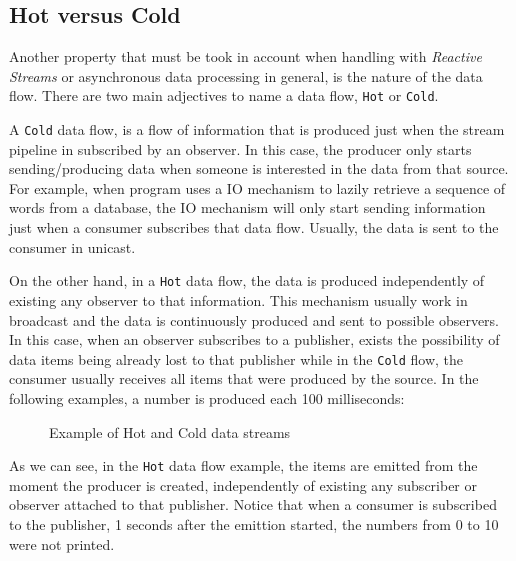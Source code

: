 	\subsection{Hot versus Cold}
	
	Another property that must be took in account when handling with \textit{Reactive Streams} or asynchronous data processing in general, is the nature of the data flow. 
	There are two main adjectives to name a data flow, \texttt{Hot} or \texttt{Cold}. 

	A \texttt{Cold} data flow, is a flow of information that is produced just when the stream pipeline in subscribed by an observer. In this case, the producer only starts sending/producing data when someone is interested in the data from that source. 
	For example, when program uses a IO mechanism to lazily retrieve a sequence of words from a database, the IO mechanism will only start sending information just when a consumer subscribes that data flow. Usually, the data is sent to the consumer in unicast.
	
	On the other hand, in a \texttt{Hot} data flow, the data is produced independently of existing any observer to that information. This mechanism usually work in broadcast and the data is continuously produced and sent to possible observers.
	In this case, when an observer subscribes to a publisher, exists the possibility of data items being already lost to that publisher while in the \texttt{Cold} flow, the consumer usually receives all items that were produced by the source.
	In the following examples, a number is produced each 100 milliseconds:

	\begin{figure}[H]
		\centering
		\begin{subfigure}{.5\textwidth}
			\centering
		 \end{subfigure}	
	\qquad\qquad
		 \begin{subfigure}{.5\textwidth}
			\centering
		\end{subfigure}		
	  \caption{Example of Hot and Cold data streams}
	  \label{fig:exmplo3}
	\end{figure}

	
	As we can see, in the \texttt{Hot} data flow example, the items are emitted from the moment the producer is created, independently of existing any subscriber or observer attached to that publisher. Notice that when a consumer is subscribed to the publisher, 1 seconds after the emittion started, the numbers from 0 to 10 were not printed.
	
